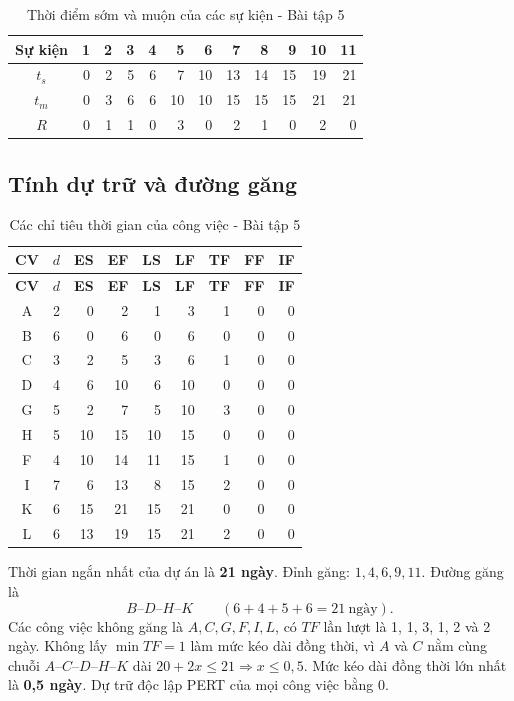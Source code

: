 \begin{table}[H]\centering
\caption{Thời điểm sớm và muộn của các sự kiện - Bài tập 5}
\begin{tabular}{c|rrrrrrrrrrr}
\toprule
Sự kiện&1&2&3&4&5&6&7&8&9&10&11\\
\midrule
$t_s$&0&2&5&6&7&10&13&14&15&19&21\\
$t_m$&0&3&6&6&10&10&15&15&15&21&21\\
$R$&0&1&1&0&3&0&2&1&0&2&0\\
\bottomrule
\end{tabular}
\end{table}

\subsection{Tính dự trữ và đường găng}

\begin{longtable}{c|r|rr|rr|rrr}
\caption{Các chỉ tiêu thời gian của công việc - Bài tập 5}\\
\toprule
\textbf{CV}&\textbf{$d$}&\textbf{ES}&\textbf{EF}&\textbf{LS}&\textbf{LF}&\textbf{TF}&\textbf{FF}&\textbf{IF}\\
\midrule
\endfirsthead
\toprule
\textbf{CV}&\textbf{$d$}&\textbf{ES}&\textbf{EF}&\textbf{LS}&\textbf{LF}&\textbf{TF}&\textbf{FF}&\textbf{IF}\\
\midrule
\endhead
A&2&0&2&1&3&1&0&0\\
B&6&0&6&0&6&0&0&0\\
C&3&2&5&3&6&1&0&0\\
D&4&6&10&6&10&0&0&0\\
G&5&2&7&5&10&3&0&0\\
H&5&10&15&10&15&0&0&0\\
F&4&10&14&11&15&1&0&0\\
I&7&6&13&8&15&2&0&0\\
K&6&15&21&15&21&0&0&0\\
L&6&13&19&15&21&2&0&0\\
\bottomrule
\end{longtable}

Thời gian ngắn nhất của dự án là \textbf{21 ngày}. Đỉnh găng: $1,4,6,9,11$.
Đường găng là
\[
  \boxed{B\text{--}D\text{--}H\text{--}K\qquad (6+4+5+6=21\ \text{ngày})}.
\]
Các công việc không găng là $A,C,G,F,I,L$, có $TF$ lần lượt là 1, 1, 3,
1, 2 và 2 ngày. Không lấy $\min TF=1$ làm mức kéo dài đồng thời, vì $A$ và
$C$ nằm cùng chuỗi $A$--$C$--$D$--$H$--$K$ dài $20+2x\le 21\Rightarrow x\le 0{,}5$.
Mức kéo dài đồng thời lớn nhất là \textbf{0,5 ngày}. Dự trữ độc lập PERT
của mọi công việc bằng 0.

